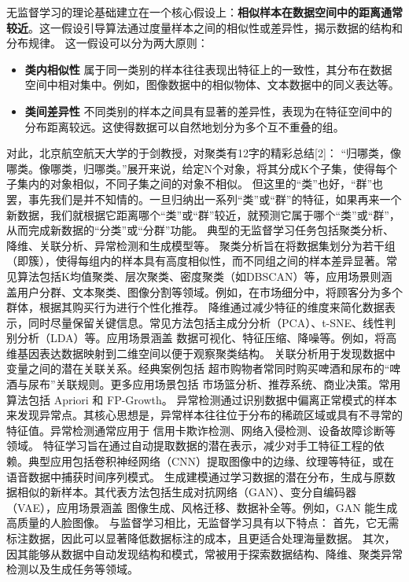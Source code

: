 无监督学习的理论基础建立在一个核心假设上：{\bf 相似样本在数据空间中的距离通常较近}。这一假设引导算法通过度量样本之间的相似性或差异性，揭示数据的结构和分布规律。
这一假设可以分为两大原则：
\begin{itemize}
\item {\bf 类内相似性}  属于同一类别的样本往往表现出特征上的一致性，其分布在数据空间中相对集中。例如，图像数据中的相似物体、文本数据中的同义表达等。
\item {\bf 类间差异性}  不同类别的样本之间具有显著的差异性，表现为在特征空间中的分布距离较远。这使得数据可以自然地划分为多个互不重叠的组。
\end{itemize}
对此，北京航空航天大学的于剑教授，对聚类有12字的精彩总结[2]：
“归哪类，像哪类。像哪类，归哪类。”展开来说，给定N个对象，将其分成K个子集，使得每个子集内的对象相似，不同子集之间的对象不相似。
但这里的“类”也好，“群”也罢，事先我们是并不知情的。一旦归纳出一系列“类”或“群”的特征，如果再来一个新数据，我们就根据它距离哪个“类”或“群”较近，就预测它属于哪个“类”或“群”，从而完成新数据的“分类”或“分群”功能。
典型的无监督学习任务包括聚类分析、降维、关联分析、异常检测和生成模型等。
聚类分析旨在将数据集划分为若干组（即簇），使得每组内的样本具有高度相似性，而不同组之间的样本差异显著。常见算法包括K均值聚类、层次聚类、密度聚类（如DBSCAN）等，应用场景则涵盖用户分群、文本聚类、图像分割等领域。例如，在市场细分中，将顾客分为多个群体，根据其购买行为进行个性化推荐。
降维通过减少特征的维度来简化数据表示，同时尽量保留关键信息。常见方法包括主成分分析（PCA）、t-SNE、线性判别分析（LDA）等。应用场景涵盖 数据可视化、特征压缩、降噪等。例如，将高维基因表达数据映射到二维空间以便于观察聚类结构。
关联分析用于发现数据中变量之间的潜在关联关系。经典案例包括 超市购物者常同时购买啤酒和尿布的“啤酒与尿布”关联规则。更多应用场景包括 市场篮分析、推荐系统、商业决策。常用算法包括 Apriori 和 FP-Growth。
异常检测通过识别数据中偏离正常模式的样本来发现异常点。其核心思想是，异常样本往往位于分布的稀疏区域或具有不寻常的特征值。异常检测通常应用于 信用卡欺诈检测、网络入侵检测、设备故障诊断等领域。
特征学习旨在通过自动提取数据的潜在表示，减少对手工特征工程的依赖。典型应用包括卷积神经网络（CNN）提取图像中的边缘、纹理等特征，或在语音数据中捕获时间序列模式。
生成建模通过学习数据的潜在分布，生成与原数据相似的新样本。其代表方法包括生成对抗网络（GAN）、变分自编码器（VAE），应用场景涵盖 图像生成、风格迁移、数据补全等。例如，GAN 能生成高质量的人脸图像。
与监督学习相比，无监督学习具有以下特点：
首先，它无需标注数据，因此可以显著降低数据标注的成本，且更适合处理海量数据。
其次，因其能够从数据中自动发现结构和模式，常被用于探索数据结构、降维、聚类异常检测以及生成任务等领域。
